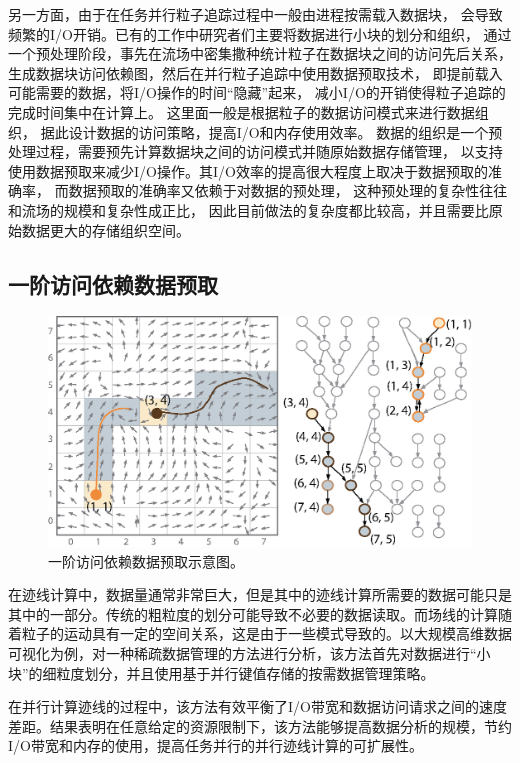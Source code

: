另一方面，由于在任务并行粒子追踪过程中一般由进程按需载入数据块，
会导致频繁的I/O开销。已有的工作\parencite{ChenNLS12,ChenXLS12}中研究者们主要将数据进行小块的划分和组织，
通过一个预处理阶段，事先在流场中密集撒种统计粒子在数据块之间的访问先后关系，
生成数据块访问依赖图，然后在并行粒子追踪中使用数据预取技术，
即提前载入可能需要的数据，将I/O操作的时间“隐藏”起来，
减小I/O的开销使得粒子追踪的完成时间集中在计算上。
这里面一般是根据粒子的数据访问模式来进行数据组织，
据此设计数据的访问策略，提高I/O和内存使用效率。
数据的组织是一个预处理过程，需要预先计算数据块之间的访问模式并随原始数据存储管理，
以支持使用数据预取来减少I/O操作。其I/O效率的提高很大程度上取决于数据预取的准确率，
而数据预取的准确率又依赖于对数据的预处理，
这种预处理的复杂性往往和流场的规模和复杂性成正比，
因此目前做法的复杂度都比较高，并且需要比原始数据更大的存储组织空间。

\subsection{一阶访问依赖数据预取}

\begin{figure}[!tb]
  \centering
  \includegraphics[width=.75\linewidth]{image/prefetch/sparse}
  \caption{
    一阶访问依赖数据预取示意图\parencite{GuoZLLYHMP14}。
  }
  \label{fig:background:sparse}
\end{figure}

在迹线计算中，数据量通常非常巨大，但是其中的迹线计算所需要的数据可能只是其中的一部分。传统的粗粒度的划分可能导致不必要的数据读取。而场线的计算随着粒子的运动具有一定的空间关系，这是由于一些模式导致的。以大规模高维数据可视化为例，对一种稀疏数据管理的方法\cite{guo2014advection}进行分析，该方法首先对数据进行“小块”的细粒度划分，并且使用基于并行键值存储的按需数据管理策略。

在并行计算迹线的过程中，该方法有效平衡了I/O带宽和数据访问请求之间的速度差距。结果表明在任意给定的资源限制下，该方法能够提高数据分析的规模，节约I/O带宽和内存的使用，提高任务并行的并行迹线计算的可扩展性。


